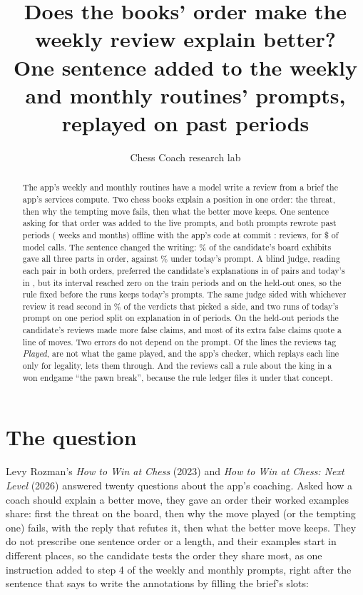 \documentclass[11pt]{article}
\title{Does the books' order make the weekly review explain better?\\[0.3em]
\large One sentence added to the weekly and monthly routines' prompts, replayed on \Cases{} past
periods}
\author{Chess Coach research lab}
\date{}
\begin{document}
\maketitle

\begin{abstract}
The app's weekly and monthly routines have a model write a review from a brief the app's services
compute. Two chess books explain a position in one order: the threat, then why the tempting move
fails, then what the better move keeps. One sentence asking for that order was added to the live
prompts, and both prompts rewrote \Cases{} past periods (\Weeks{} weeks and \Months{} months)
offline with the app's code at commit \texttt{\AppCommit}: \WriterRuns{} reviews, for \$\Spent{} of
model calls. The sentence changed the writing: \CandFullOrder\% of the candidate's board exhibits
gave all three parts in order, against \BaseFullOrder\% under today's prompt. A blind judge, reading
each pair in both orders, preferred the candidate's explanations in \ExplWins{} of \CandPairs{} pairs
and today's in \ExplLosses, but its interval reached zero on the train periods and on the held-out
ones, so the rule fixed before the runs keeps today's prompts. The same judge sided with whichever
review it read second in \SecondShare\% of the verdicts that picked a side, and two runs of today's
prompt on one period split on explanation in \NullDecisive{} of \NullPairs{} periods. On the held-out
periods the candidate's reviews made more false claims, and most of its extra false claims quote a
line of moves. Two errors do not depend on the prompt. Of the \PlayedAll{} lines the reviews tag
\emph{Played}, \PlayedWrongAll{} are not what the game played, and the app's checker, which replays
each line only for legality, lets them through. And the reviews call a rule about the king in a won
endgame ``the pawn break'', because the rule ledger files it under that concept.
\end{abstract}

\section{The question}

Levy Rozman's \emph{How to Win at Chess} (2023) and \emph{How to Win at Chess: Next Level} (2026)
answered twenty questions about the app's coaching. Asked how a coach should explain a better move,
they gave an order their worked examples share: first the threat on the board, then why the move
played (or the tempting one) fails, with the reply that refutes it, then what the better move keeps.
They do not prescribe one sentence order or a length, and their examples start in different places,
so the candidate tests the order they share most, as one instruction added to step 4 of the weekly
and monthly prompts, right after the sentence that says to write the annotations by filling the
brief's slots:
\end{document}
